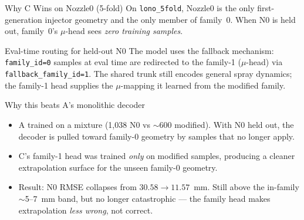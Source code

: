 \documentclass[UTF8,aspectratio=169]{ctexbeamer}
\begin{document}
\begin{frame}{Why C Wins on Nozzle0 (5-fold)}
\small
On \texttt{lono\_5fold}, Nozzle0 is the only first-generation injector geometry and
the only member of family~0. When N0 is held out, family~0's $\mu$-head sees
\emph{zero training samples}.

\vspace{0.4em}
\begin{block}{Eval-time routing for held-out N0}
The model uses the fallback mechanism: \texttt{family\_id=0} samples at eval time
are redirected to the family-1 ($\mu$-head) via \texttt{fallback\_family\_id=1}.
The shared trunk still encodes general spray dynamics; the family-1 head supplies
the $\mu$-mapping it learned from the modified family.
\end{block}

\begin{block}{Why this beats A's monolithic decoder}
\begin{itemize}\setlength\itemsep{2pt}
  \item A trained on a mixture (1{,}038 N0 vs $\sim$600 modified). With N0 held out,
        the decoder is pulled toward family-0 geometry by samples that no longer apply.
  \item C's family-1 head was trained \emph{only} on modified samples, producing a
        cleaner extrapolation surface for the unseen family-0 geometry.
  \item Result: N0 RMSE collapses from $30.58 \to 11.57$~mm. Still above the in-family
        $\sim$5--7~mm band, but no longer catastrophic --- the family head makes
        extrapolation \emph{less wrong}, not correct.
\end{itemize}
\end{block}
\end{frame}
\end{document}
